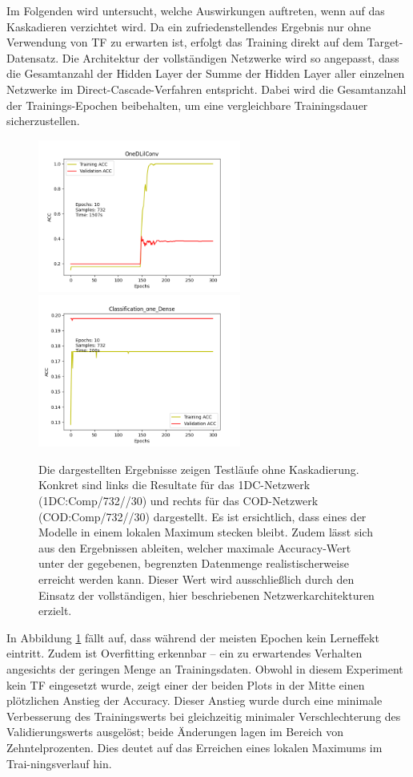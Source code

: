 Im Folgenden wird untersucht, welche Auswirkungen auftreten, wenn auf das Kaskadieren verzichtet wird. Da ein zufriedenstellendes Ergebnis 
nur ohne Verwendung von TF zu erwarten ist, erfolgt das Training direkt auf dem Target-Datensatz. Die Architektur der 
vollständigen Netzwerke wird so angepasst, dass die Gesamtanzahl der Hidden Layer der Summe der Hidden Layer aller einzelnen Netzwerke im 
Direct-Cascade-Verfahren entspricht. Dabei wird die Gesamtanzahl der Trainings-Epochen beibehalten, um eine vergleichbare Trainingsdauer 
sicherzustellen.

\begin{figure}[htpb]
    \includegraphics[height=5cm]{../../Plots/ba_plots/classnocascade/1dc.png}
    \includegraphics[height=5cm]{../../Plots/ba_plots/classnocascade/cod.png}
    \caption{\label{fig:nocascade} 
    \small{Die dargestellten Ergebnisse zeigen Testläufe ohne Kaskadierung. Konkret sind links die Resultate für das 1DC-Netzwerk (1DC:Comp/732//30) 
    und rechts für das COD-Netzwerk (COD:Comp/732//30) dargestellt. Es ist ersichtlich, dass eines der Modelle in einem lokalen Maximum stecken bleibt. 
    Zudem lässt sich aus den Ergebnissen ableiten, welcher maximale Accuracy-Wert unter der gegebenen, begrenzten Datenmenge realistischerweise 
    erreicht werden kann. Dieser Wert wird ausschließlich durch den Einsatz der vollständigen, hier beschriebenen Netzwerkarchitekturen erzielt.}}
\end{figure}

In Abbildung \ref{fig:nocascade} fällt auf, dass während der meisten Epochen kein Lerneffekt eintritt. Zudem ist Overfitting 
erkennbar – ein zu erwartendes Verhalten angesichts der geringen Menge an Trainingsdaten. Obwohl in diesem Experiment kein TF eingesetzt wurde, 
zeigt einer der beiden Plots in der Mitte einen plötzlichen Anstieg der Accuracy. Dieser Anstieg wurde durch eine minimale Verbesserung des 
Trainingswerts bei gleichzeitig minimaler Verschlechterung des Validierungswerts ausgelöst; beide Änderungen lagen im Bereich von 
Zehntelprozenten. Dies deutet auf das Erreichen eines lokalen Maximums im Trai-ningsverlauf hin.

